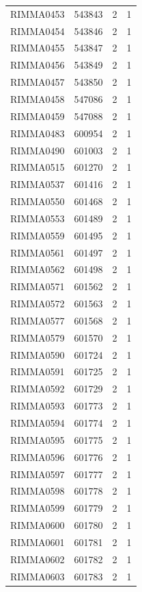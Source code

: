 \documentclass[11pt]{article}
\newcounter{rowno}
\begin{document}
\begin{scriptsize}
\begin{longtable}{>{\stepcounter{rowno}}cccc}
    RIMMA0453 & 543843 & 2     & 1 \\
    RIMMA0454 & 543846 & 2     & 1 \\
    RIMMA0455 & 543847 & 2     & 1 \\
    RIMMA0456 & 543849 & 2     & 1 \\
    RIMMA0457 & 543850 & 2     & 1 \\
    RIMMA0458 & 547086 & 2     & 1 \\
    RIMMA0459 & 547088 & 2     & 1 \\
    RIMMA0483 & 600954 & 2     & 1 \\
    RIMMA0490 & 601003 & 2     & 1 \\
    RIMMA0515 & 601270 & 2     & 1 \\
    RIMMA0537 & 601416 & 2     & 1 \\
    RIMMA0550 & 601468 & 2     & 1 \\
    RIMMA0553 & 601489 & 2     & 1 \\
    RIMMA0559 & 601495 & 2     & 1 \\
    RIMMA0561 & 601497 & 2     & 1 \\
    RIMMA0562 & 601498 & 2     & 1 \\
    RIMMA0571 & 601562 & 2     & 1 \\
    RIMMA0572 & 601563 & 2     & 1 \\
    RIMMA0577 & 601568 & 2     & 1 \\
    RIMMA0579 & 601570 & 2     & 1 \\
    RIMMA0590 & 601724 & 2     & 1 \\
    RIMMA0591 & 601725 & 2     & 1 \\
    RIMMA0592 & 601729 & 2     & 1 \\
    RIMMA0593 & 601773 & 2     & 1 \\
    RIMMA0594 & 601774 & 2     & 1 \\
    RIMMA0595 & 601775 & 2     & 1 \\
    RIMMA0596 & 601776 & 2     & 1 \\
    RIMMA0597 & 601777 & 2     & 1 \\
    RIMMA0598 & 601778 & 2     & 1 \\
    RIMMA0599 & 601779 & 2     & 1 \\
    RIMMA0600 & 601780 & 2     & 1 \\
    RIMMA0601 & 601781 & 2     & 1 \\
    RIMMA0602 & 601782 & 2     & 1 \\
    RIMMA0603 & 601783 & 2     & 1 \\

\end{longtable}
\end{scriptsize}
\end{document}
